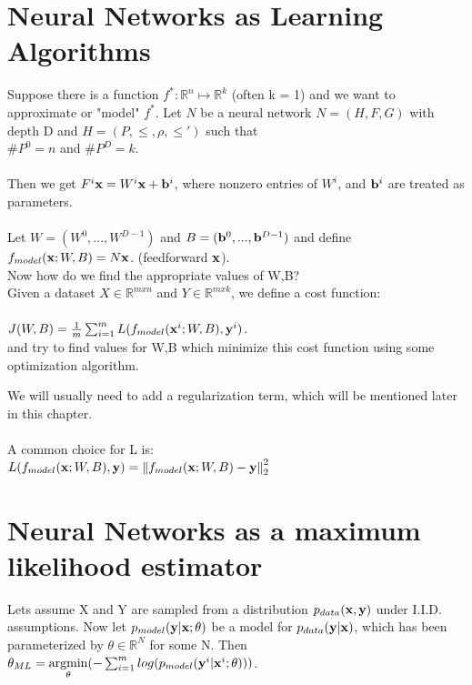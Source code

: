 \section{Neural Networks as Learning Algorithms}
Suppose there is a function $f^{*}:\mathbb{R}^{n} \mapsto \mathbb{R}^{k}$ (often k = 1) and we want to approximate or "model" $f^{*}$. Let $N$ be a neural network $N = (H,F,G)$ with depth D and $H = (P, \leq , \rho , \leq' )$ such that\\
 $\#P^{0} = n$ and $\#P^{D} = k$.\\
 \\
 Then we get $F^{i}{\vx} = W^{i}{\vx} + {\vb}^{i}$, where nonzero entries of $W^{i}$, and ${\vb}^{i}$ are treated as parameters.\\
 \\
 Let $W = (W^{0},...,W^{D-1})$ and $B = ({\vb}^{0},...,{\vb}^{D-1})$ and define $f_{model}({\vx};W,B) = N{\vx}$. (feedforward ${\vx}$).\\
 Now how do we find the appropriate values of W,B?\\
 Given a dataset $X \in \mathbb{R}^{mxn}$ and $Y \in \mathbb{R}^{mxk}$, we define a cost function:\\
\\
 $J(W,B) = \frac{1}{m} \sum_{i=1}^{m} L(f_{model}({\vx}^{i};W,B),{\vy}^{i})$.\\
and try to find values for W,B which minimize this cost function using some optimization algorithm.\\
\begin{note}
We will usually need to add a regularization term, which will be mentioned later in this chapter.\\
\\
A common choice for L is:\\
$L(f_{model}({\vx};W,B),{\vy}) = \norm{f_{model}({\vx};W,B) - {\vy}}_{2}^{2}$\\
\end{note}

\section{Neural Networks as a maximum likelihood estimator}
Lets assume X and Y are sampled from a distribution $p_{data}({\vx},{\vy})$ under I.I.D. assumptions.
Now let $p_{model}({\vy}|{\vx};\theta)$ be a model for $p_{data}({\vy}|{\vx})$, which has been parameterized by $\theta \in \mathbb{R}^{N}$ for some N.
Then $\theta_{ML} = \underset{\theta}{\mathrm{argmin}}(-\sum_{i=1}^{m}log(p_{model}({\vy}^{i}|{\vx}^{i};\theta))) $.


